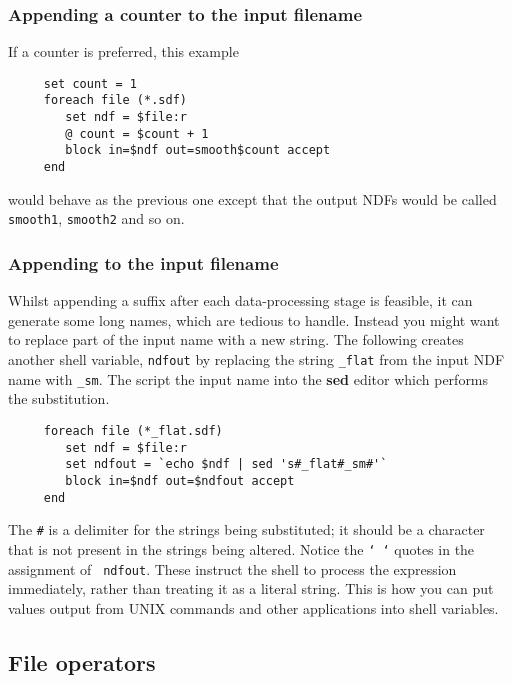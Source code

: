 \subsubsection{Appending a counter to the input
filename\label{sc4_se_append_counter}}

If a counter is preferred, this example

\small
\begin{verbatim}
     set count = 1
     foreach file (*.sdf)
        set ndf = $file:r
        @ count = $count + 1
        block in=$ndf out=smooth$count accept
     end
\end{verbatim}
\normalsize
would behave as the previous one except that the output NDFs would be
called {\tt smooth1}, {\tt smooth2} and so on.

\subsubsection{Appending to the input
filename\label{sc4_se_filename_substitution}}

Whilst appending a suffix after each data-processing stage is feasible,
it can generate some long names, which are tedious to handle.  Instead
you might want to replace part of the input name with a new string.  The
following creates another shell variable, {\tt ndfout} by replacing the
string {\tt \_flat} from the input NDF name with {\tt \_sm}.  The script
 the input name into the {\bf sed} editor which performs the
substitution. 

\small
\begin{verbatim}
     foreach file (*_flat.sdf)
        set ndf = $file:r
        set ndfout = `echo $ndf | sed 's#_flat#_sm#'`
        block in=$ndf out=$ndfout accept
     end
\end{verbatim}
\normalsize
The {\tt \#} is a delimiter for the strings being substituted; it
should be a character that is not present in the strings being
altered.  Notice the {\tt ` `} quotes in the assignment of {\tt
ndfout}.  These instruct the shell to process the expression
immediately, rather than treating it as a literal string.  This is how
you can put values output from UNIX commands and other applications into
shell variables.

\subsection{File operators
\label{sc4_se_file_operators}}

